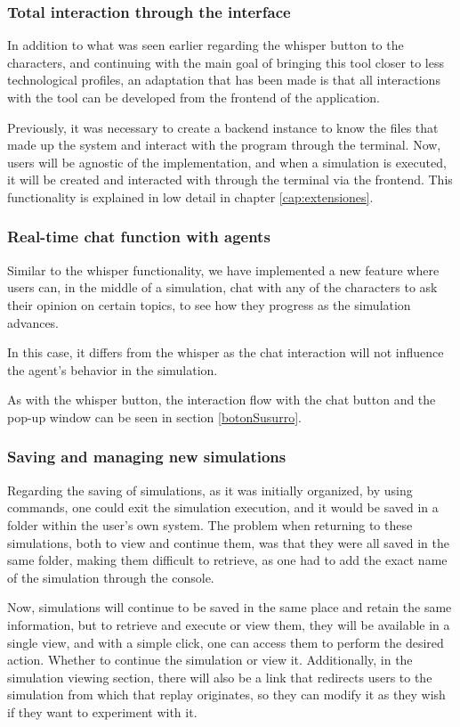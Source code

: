 \subsubsection*{Total interaction through the interface}
In addition to what was seen earlier regarding the whisper button to the characters, and continuing with the main goal of bringing this tool closer to less technological profiles, an adaptation that has been made is that all interactions with the tool can be developed from the frontend of the application.

Previously, it was necessary to create a backend instance to know the files that made up the system and interact with the program through the terminal. Now, users will be agnostic of the implementation, and when a simulation is executed, it will be created and interacted with through the terminal via the frontend. This functionality is explained in low detail in chapter \ref{cap:extensiones}.

\subsubsection*{Real-time chat function with agents}
Similar to the whisper functionality, we have implemented a new feature where users can, in the middle of a simulation, chat with any of the characters to ask their opinion on certain topics, to see how they progress as the simulation advances.

In this case, it differs from the whisper as the chat interaction will not influence the agent's behavior in the simulation.

As with the whisper button, the interaction flow with the chat button and the pop-up window can be seen in section \ref{botonSusurro}.

\subsubsection*{Saving and managing new simulations}

Regarding the saving of simulations, as it was initially organized, by using commands, one could exit the simulation execution, and it would be saved in a folder within the user's own system. The problem when returning to these simulations, both to view and continue them, was that they were all saved in the same folder, making them difficult to retrieve, as one had to add the exact name of the simulation through the console.

Now, simulations will continue to be saved in the same place and retain the same information, but to retrieve and execute or view them, they will be available in a single view, and with a simple click, one can access them to perform the desired action. Whether to continue the simulation or view it. Additionally, in the simulation viewing section, there will also be a link that redirects users to the simulation from which that replay originates, so they can modify it as they wish if they want to experiment with it.

